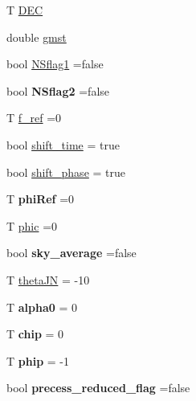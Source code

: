 \begin{DoxyCompactItemize}
\item 
T \hyperlink{classgen__params__base_a1028e164a2ee18b60d4ae902165aefea}{D\+EC}
\item 
double \hyperlink{classgen__params__base_a9cf0459a975c748e8fa828b8af093611}{gmst}
\item 
bool \hyperlink{classgen__params__base_a03398714fe7005a9c80336733c9a2043}{N\+Sflag1} =false
\item 
\mbox{\label{classgen__params__base_ad2a4aeb08378293bb6d24e6060fe028f}} 
bool {\bfseries N\+Sflag2} =false
\item 
T \hyperlink{classgen__params__base_a8aafd6ccd8331c201bc0f301898d5606}{f\+\_\+ref} =0
\item 
bool \hyperlink{classgen__params__base_adebbc3e4955f322fde2c9ac61f3f61e8}{shift\+\_\+time} = true
\item 
bool \hyperlink{classgen__params__base_a8753041140d91176f966b5f8dfc7de34}{shift\+\_\+phase} = true
\item 
\mbox{\label{classgen__params__base_a321a6f0749f80d869c47eba274d8b6ff}} 
T {\bfseries phi\+Ref} =0
\item 
T \hyperlink{classgen__params__base_a4da02c658f87191c55bb040d5da46143}{phic} =0
\item 
\mbox{\label{classgen__params__base_a01109130de63d4105164c732afc6dbd1}} 
bool {\bfseries sky\+\_\+average} =false
\item 
T \hyperlink{classgen__params__base_ac855eff52f4ec75a63900f63fb8a1942}{theta\+JN} = -\/10
\item 
\mbox{\label{classgen__params__base_a4f6b7235552757d42a412693c7490c2f}} 
T {\bfseries alpha0} = 0
\item 
\mbox{\label{classgen__params__base_a7635c4e8529dd34b2cf1dbd1c706fa21}} 
T {\bfseries chip} = 0
\item 
\mbox{\label{classgen__params__base_a313d4d82fe7474eba59562af31cb20b8}} 
T {\bfseries phip} = -\/1
\item 
\mbox{\label{classgen__params__base_ab0d2c6df726cc6118d6a58661e6ac7e8}} 
bool {\bfseries precess\+\_\+reduced\+\_\+flag} =false

\end{DoxyCompactItemize}
